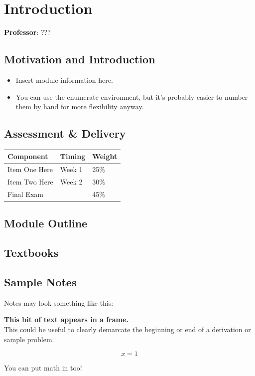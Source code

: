 \documentclass[12pt]{article}
\begin{document}
\begin{flushright}[Lecture on ?.?]\end{flushright}

\section{Introduction}
\textbf{Professor}: ???

\subsection{Motivation and Introduction}
\begin{itemize}[noitemsep]
    \item Insert module information here.
    \item You can use the enumerate environment, but it's probably easier to number them by hand for more flexibility anyway.
\end{itemize}

\subsection{Assessment \& Delivery}
    \begin{tabular}{ |l l l| }
        \hline
        \textbf{Component} & \textbf{Timing} & \textbf{Weight} \\ \hline
        Item One Here       & Week 1        & 25\% \\ \hline
        Item Two Here       & Week 2        & 30\% \\ \hline
        Final Exam          &               & 45\% \\ \hline
    \end{tabular}


\subsection{Module Outline}

\subsection{Textbooks}

\subsection{Sample Notes}
Notes may look something like this:
\begin{framed}
\textbf{This bit of text appears in a frame.}\\
This could be useful to clearly demarcate the beginning or end of a derivation or sample problem.

\[ x=1 \]

You can put math in too!

\end{framed}
\end{document}
